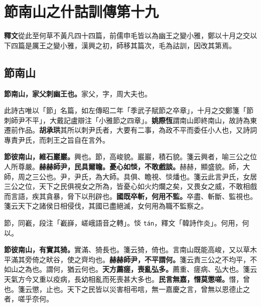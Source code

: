 \chapter{節南山之什詁訓傳第十九}

\begin{quoting}\textbf{釋文}從此至何草不黃凡四十四篇，前儒申毛皆以為幽王之變小雅，鄭以十月之交以下四篇是厲王之變小雅，漢興之初，師移其篇次，毛為詁訓，因改其第焉。\end{quoting}

\section{節南山}


\textbf{節南山，家父刺幽王也。}{\footnotesize 家父，字，周大夫也。}

\begin{quoting}此詩古唯以「節」名篇，如左傳昭二年「季武子賦節之卒章」，十月之交鄭箋「節刺師尹不平」，大戴記盧辯注「小雅節之四章」。\textbf{姚際恆}謂南山即終南山，故詩為東遷前作品。\textbf{胡承珙}其所以刺尹氏者，大要有二事，為政不平而委任小人也，又詩詞專責尹氏，而刺王之旨自在言外。\end{quoting}

\textbf{節彼南山，維石巖巖。}{\footnotesize 興也。節，高峻貌。巖巖，積石貌。箋云興者，喻三公之位人所尊嚴。}\textbf{赫赫師尹，民具爾瞻。憂心如惔，不敢戲談。}{\footnotesize 赫赫，顯盛貌。師，大師，周之三公也。尹，尹氏，為大師。具俱、瞻視、惔燔也。箋云此言尹氏，女居三公之位，天下之民俱視女之所為，皆憂心如火灼爛之矣，又畏女之威，不敢相戲而言語，疾其貪暴，脅下以刑辟也。}\textbf{國既卒斬，何用不監。}{\footnotesize 卒盡、斬斷、監視也。箋云天下之諸侯日相侵伐，其國已盡絕滅，女何用為職不監察之。}

\begin{quoting}節，同嶻，段注「嶻嶭，嵯峨語音之轉」。惔 \texttt{tán}，釋文「韓詩作炎」。何用，何以。\end{quoting}

\textbf{節彼南山，有實其猗。}{\footnotesize 實滿、猗長也。箋云猗，倚也。言南山既能高峻，又以草木平滿其旁倚之畎谷，使之齊均也。}\textbf{赫赫師尹，不平謂何。}{\footnotesize 箋云責三公之不均平，不如山之為也。謂何，猶云何也。}\textbf{天方薦瘥，喪亂弘多。}{\footnotesize 薦重、瘥病、弘大也。箋云天氣方今又重以疫病，長幼相亂而死喪甚大多也。}\textbf{民言無嘉，憯莫懲嗟。}{\footnotesize 憯，曾也。箋云懲，止也。天下之民皆以災害相弔唁，無一嘉慶之言，曾無以恩德止之者，嗟乎奈何。}


